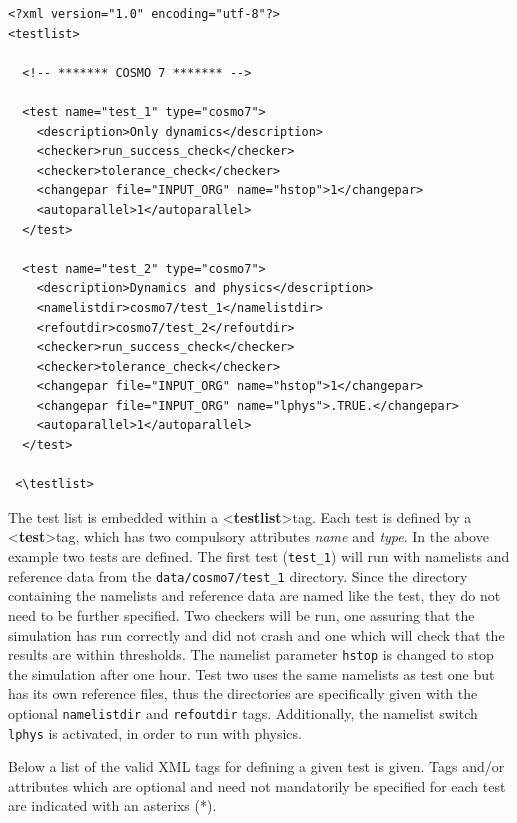 \documentclass[12pt,twoside,a4paper]{report}
\newcommand{\tl}{\textless}
\newcommand{\tg}{\textgreater}
\newcommand{\tbf}{\textbf}
\newcommand{\tit}{\textit}
\newcommand{\hs}{\hspace{1mm}}
\begin{document}
\begin{verbatim}
<?xml version="1.0" encoding="utf-8"?>
<testlist>

  <!-- ******* COSMO 7 ******* -->

  <test name="test_1" type="cosmo7">
    <description>Only dynamics</description>
    <checker>run_success_check</checker>
    <checker>tolerance_check</checker>
    <changepar file="INPUT_ORG" name="hstop">1</changepar>
    <autoparallel>1</autoparallel>
  </test>
  
  <test name="test_2" type="cosmo7">
    <description>Dynamics and physics</description>
    <namelistdir>cosmo7/test_1</namelistdir>
    <refoutdir>cosmo7/test_2</refoutdir>
    <checker>run_success_check</checker>
    <checker>tolerance_check</checker>
    <changepar file="INPUT_ORG" name="hstop">1</changepar>
    <changepar file="INPUT_ORG" name="lphys">.TRUE.</changepar>
    <autoparallel>1</autoparallel>
  </test>
  
 <\testlist>
\end{verbatim}

The test list is embedded within a \tl \tbf{testlist}\tg \hs tag. Each test is defined by a \tl \tbf{test}\tg  \hs tag, which has two compulsory attributes \tit{name} and \tit{type}. In the above example two tests are defined. The first test (\texttt{test\_1}) will run with namelists and reference data from the \texttt{data/cosmo7/test\_1} directory. Since the directory containing the namelists and reference data are named like the test, they do not need to be further specified. Two checkers will be run, one assuring that the simulation has run correctly and did not crash and one which will check that the results are within thresholds. The namelist parameter \texttt{hstop} is changed to stop the simulation after one hour. Test two uses the same namelists as test one but has its own reference files, thus the directories are specifically given with the optional \texttt{namelistdir} and \texttt{refoutdir} tags. Additionally, the namelist switch \texttt{lphys} is activated, in order to run with physics.

Below a list of the valid XML tags for defining a given test is given. Tags and/or attributes which are optional and need not mandatorily be specified for each test are indicated with an asterixs (*).\\
\end{document}
